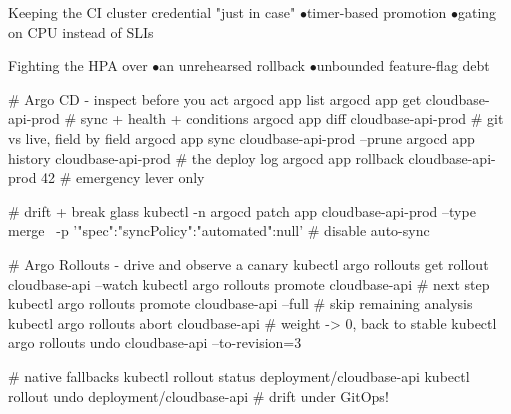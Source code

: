 \begin{wbitem}
  \item Keeping the CI cluster credential "just in case" \quad$\bullet$\quad timer-based promotion \quad$\bullet$\quad gating on CPU instead of SLIs
  \item Fighting the HPA over  \quad$\bullet$\quad an unrehearsed rollback \quad$\bullet$\quad unbounded feature-flag debt
\end{wbitem}

\begin{cheatsheet}
\end{cheatsheet}

\begin{bashbox}
# Argo CD - inspect before you act
argocd app list
argocd app get cloudbase-api-prod          # sync + health + conditions
argocd app diff cloudbase-api-prod         # git vs live, field by field
argocd app sync cloudbase-api-prod --prune
argocd app history cloudbase-api-prod      # the deploy log
argocd app rollback cloudbase-api-prod 42  # emergency lever only

# drift + break glass
kubectl -n argocd patch app cloudbase-api-prod --type merge \
  -p '{"spec":{"syncPolicy":{"automated":null}}}'   # disable auto-sync

# Argo Rollouts - drive and observe a canary
kubectl argo rollouts get rollout cloudbase-api --watch
kubectl argo rollouts promote cloudbase-api        # next step
kubectl argo rollouts promote cloudbase-api --full # skip remaining analysis
kubectl argo rollouts abort cloudbase-api          # weight -> 0, back to stable
kubectl argo rollouts undo cloudbase-api --to-revision=3

# native fallbacks
kubectl rollout status deployment/cloudbase-api
kubectl rollout undo deployment/cloudbase-api      # drift under GitOps!
\end{bashbox}

